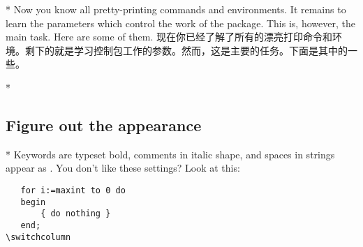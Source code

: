 \begin{paracol}{2}
\switchcolumn[0]*%
Now you know all pretty-printing commands and environments. It remains
to learn the parameters which control the work of the 
package. This is, however, the main task. Here are some of them.
\switchcolumn
现在你已经了解了所有的漂亮打印命令和环境。剩下的就是学习控制包工作的参数。然而，这是主要的任务。下面是其中的一些。

\switchcolumn[0]*%
\subsection{Figure out the appearance}\label{gFigureOutTheAppearance}
\switchcolumn

\switchcolumn[0]*%
Keywords are typeset bold, comments in italic shape, and spaces in strings
appear as \textvisiblespace. You don't like these settings? Look at this:
\ifcolor
\begin{lstxsample}
\end{lstxsample}
\else
\begin{lstxsample}
   \lstset{%
       basicstyle=\small,          %
       keywordstyle=\bfseries\underbar,
       identifierstyle=,           %
       commentstyle=\itshape,      %
       stringstyle=\ttfamily,      %
       showstringspaces=false}     %
\end{lstxsample}
\fi
\begin{lstsample}{}{}
   \begin{lstlisting}
   for i:=maxint to 0 do
   begin
       { do nothing }
   end;
\switchcolumn


\end{lstlisting}
\end{lstsample}
\end{paracol}
